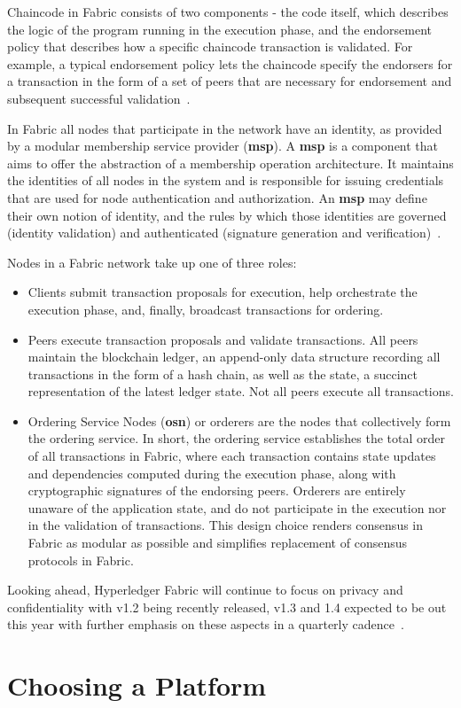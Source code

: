 Chaincode in Fabric consists of two components - the code itself, which
describes the logic of the program running in the execution phase, and the
endorsement policy that describes how a specific chaincode transaction is
validated. For example, a typical endorsement policy lets the chaincode specify
the endorsers for a transaction in the form of a set of peers that are
necessary for endorsement and subsequent successful
validation~\cite{Androulaki2018}.

In Fabric all nodes that participate in the network have an identity, as
provided by a modular membership service provider (\textbf{msp}).  A
\textbf{msp} is a component that aims to offer the abstraction of a membership
operation architecture.  It maintains the identities of all nodes in the system
and is responsible for issuing credentials that are used for node
authentication and authorization. An \textbf{msp} may define their own notion
of identity, and the rules by which those identities are governed (identity
validation) and authenticated (signature generation and
verification)~\cite{HyperledgerFabricDocs2017}.

Nodes in a Fabric network take up one of three roles:

\begin{itemize}
  \item Clients submit transaction proposals for execution, help orchestrate
    the execution phase, and, finally, broadcast transactions for ordering.

  \item Peers execute transaction proposals and validate transactions.  All
    peers maintain the blockchain ledger, an append-only data structure
    recording all transactions in the form of a hash chain, as well as the
    state, a succinct representation of the latest ledger state. Not all peers
    execute all transactions.

  \item Ordering Service Nodes (\textbf{osn}) or orderers are the nodes that
    collectively form the ordering service. In short, the ordering service
    establishes the total order of all transactions in Fabric, where each
    transaction contains state updates and dependencies computed during the
    execution phase, along with cryptographic signatures of the endorsing
    peers.  Orderers are entirely unaware of the application state, and do not
    participate in the execution nor in the validation of transactions. This
    design choice renders consensus in Fabric as modular as possible and
    simplifies replacement of consensus protocols in Fabric. 
\end{itemize}

Looking ahead, Hyperledger Fabric will continue to focus on privacy and
confidentiality with v1.2 being recently released, v1.3 and 1.4 expected to be
out this year with further emphasis on these aspects in a quarterly
cadence~\cite{hyperledgerRoadmap2018}.

\section{Choosing a Platform}
